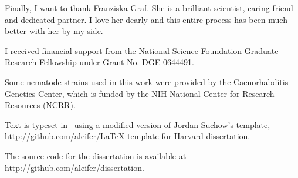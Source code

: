 Finally, I want to thank Franziska Graf. She is a brilliant scientist, caring friend and dedicated partner. I love her dearly and this entire process has been much better with her by my side.



I received financial support from the National Science Foundation 
Graduate Research Fellowship under Grant No. DGE-0644491.

Some nematode strains used in this work were provided by the Caenorhabditis Genetics Center, which is funded by the NIH National Center for Research Resources (NCRR).

Text is typeset in \XeTeX ~using a modified version of Jordan Suchow's template, \url{http://github.com/aleifer/LaTeX-template-for-Harvard-dissertation}.

The source code for the dissertation is available at \url{http://github.com/aleifer/dissertation}.



